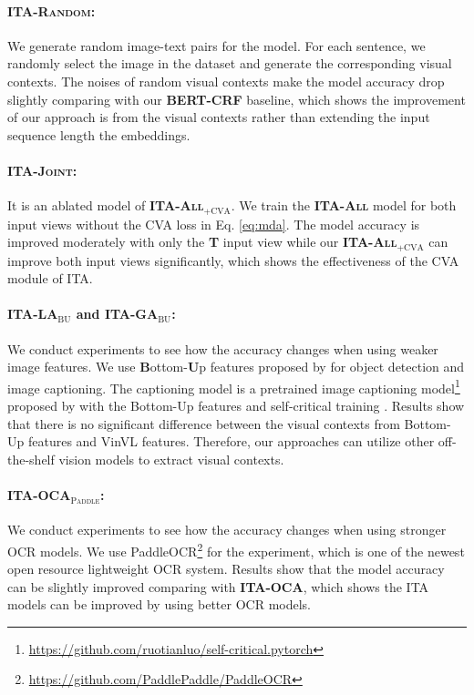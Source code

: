 \documentclass[11pt]{article}
\begin{document}
\paragraph{\textsc{\bf ITA-Random}:} We generate random image-text pairs for the model. For each sentence, we randomly select the image in the dataset and generate the corresponding visual contexts. The noises of random visual contexts make the model accuracy drop slightly comparing with our \textsc{\bf BERT-CRF} baseline, which shows the improvement of our approach is from the visual contexts rather than extending the input sequence length the embeddings.
\paragraph{\textsc{\bf ITA-Joint}:} It is an ablated model of \textsc{\bf ITA-All$_{\text{+CVA}}$}. We train the \textsc{\bf ITA-All} model for both input views without the CVA loss in Eq. \ref{eq:mda}. The model accuracy is improved moderately with only the \textbf{T} input view while our \textsc{\bf ITA-All$_{\text{+CVA}}$} can improve both input views significantly, which shows the effectiveness of the CVA module of ITA.
\paragraph{\textsc{\bf ITA-LA$_{\text{BU}}$} and \textsc{\bf ITA-GA$_{\text{BU}}$}:} We conduct experiments to see how the accuracy changes when using weaker image features. We use \textbf{B}ottom-\textbf{U}p features proposed by \citet{Anderson2017up-down} for object detection and image captioning. The captioning model is a pretrained image captioning model\footnote{\url{https://github.com/ruotianluo/self-critical.pytorch}} proposed by \citet{Luo2018DiscriminabilityOF} with the Bottom-Up features and self-critical training \citep{rennie2017self}. Results show that there is no significant difference between the visual contexts from Bottom-Up features and VinVL features. Therefore, our approaches can utilize other off-the-shelf vision models to extract visual contexts.
\paragraph{\textsc{\bf ITA-OCA$_{\text{Paddle}}$}:} We conduct experiments to see how the accuracy changes when using stronger OCR models. We use PaddleOCR\footnote{\url{https://github.com/PaddlePaddle/PaddleOCR}} for the experiment, which is one of the newest open resource lightweight OCR system. Results show that the model accuracy can be slightly improved comparing with \textsc{\bf ITA-OCA}, which shows the ITA models can be improved by using better OCR models.
\end{document}
